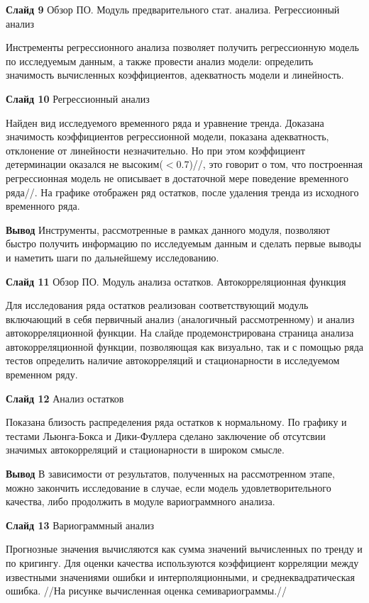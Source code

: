 \documentclass[a4paper,10pt]{report}
\begin{document}
\textbf{Слайд 9} Обзор ПО. Модуль предварительного стат. анализа. Регрессионный анализ

Инстременты регрессионного анализа позволяет получить регрессионную модель по исследуемым данным, а также провести анализ модели: определить значимость вычисленных коэффициентов, адекватность модели и линейность.

\textbf{Слайд 10} Регрессионный анализ

Найден вид исследуемого временного ряда и уравнение тренда. Доказана значимость коэффициентов регрессионной модели, показана адекватность, отклонение от линейности незначительно. Но при этом коэффициент детерминации оказался не высоким($<0.7$)//, это говорит о том, что построенная регрессионная модель не описывает в достаточной мере поведение временного ряда//. На графике отображен ряд остатков, после удаления тренда из исходного временного ряда.

\textbf{Вывод} Инструменты, рассмотренные в рамках данного модуля, позволяют быстро получить информацию по исследуемым данным и сделать первые выводы и наметить шаги по дальнейшему исследованию.

\textbf{Слайд 11} Обзор ПО. Модуль анализа остатков. Автокорреляционная функция

Для исследования ряда остатков реализован соответствующий модуль включающий в себя первичный анализ (аналогичный рассмотренному) и анализ автокорреляционной функции. На слайде продемонстрирована страница анализа автокорреляционной функции, позволяющая как визуально, так и с помощью ряда тестов определить наличие автокорреляций и стационарности в исследуемом временном ряду.

\textbf{Слайд 12} Анализ остатков

Показана близость распределения ряда остатков к нормальному. По графику и тестами Льюнга-Бокса и Дики-Фуллера сделано заключение об отсутсвии значимых автокорреляций и стационарности в широком смысле.

\textbf{Вывод} В зависимости от результатов, полученных на рассмотренном этапе, можно закончить исследование в случае, если модель удовлетворительного качества, либо продолжить в модуле вариограммного анализа.

\textbf{Слайд 13} Вариограммный анализ

Прогнозные значения вычисляются как сумма значений вычисленных по тренду и по кригингу. Для оценки качества используются коэффициент корреляции между известными значениями ошибки и интерполяционными, и среднеквадратическая ошибка. //На рисунке вычисленная оценка семивариограммы.//
\end{document}
